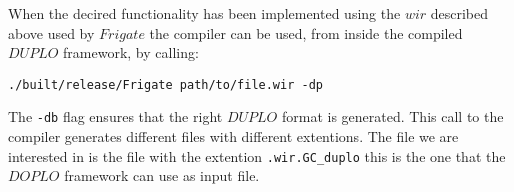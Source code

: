 \documentclass[twoside,11pt,openright]{report}
\begin{document}
When the decired functionality has been implemented using the $wir$ described above used by $Frigate$ the compiler can be used, from inside the compiled $DUPLO$ framework, by calling:

\begin{center}
\begin{verbatim}
./built/release/Frigate path/to/file.wir -dp
\end{verbatim}
\end{center}

The \verb|-db| flag ensures that the right $DUPLO$ format is generated. This call to the compiler generates different files with different extentions. The file we are interested in is the file with the extention \verb|.wir.GC_duplo| this is the one that the $DOPLO$ framework can use as input file.

\bigskip
\end{document}
